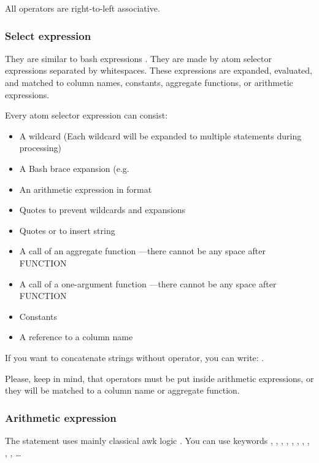 All operators are right-to-left associative.

\subsubsection{Select expression}
They are similar to bash expressions \cite{bash-reference-manual}. They are made by atom selector expressions separated by whitespaces. These expressions are expanded, evaluated, and matched to column names, constants, aggregate functions, or arithmetic expressions.

Every atom selector expression can consist:
\begin{itemize}
    \item A wildcard (Each wildcard will be expanded to multiple statements during processing)
    \item A Bash brace expansion (e.g.  \cite{bash-reference-manual}
    \item An arithmetic expression in  format
    \item Quotes  to prevent wildcards and expansions
    \item Quotes  or  to insert string
    \item A call of an aggregate function ---there cannot be any space after FUNCTION
    \item A call of a one-argument function ---there cannot be any space after FUNCTION
    \item Constants
    \item A reference to a column name
\end{itemize}

If you want to concatenate strings without \icode{++} operator, you can write: \break{}.

Please, keep in mind, that operators must be put inside arithmetic expressions, or they will be matched to a column name or aggregate function.

\subsubsection{Arithmetic expression}
The statement uses mainly classical awk logic \cite{awk-reference-manual}.  
You can use keywords \icode{\textgreater}, \icode{\textless}, \icode{\textless=}, \icode{\textgreater=}, \icode{==}, \icode{$\vert\vert$}, \icode{\&\&}, \icode{+}, \icode{-}, \icode{*}, \icode{/}\ldots{}

